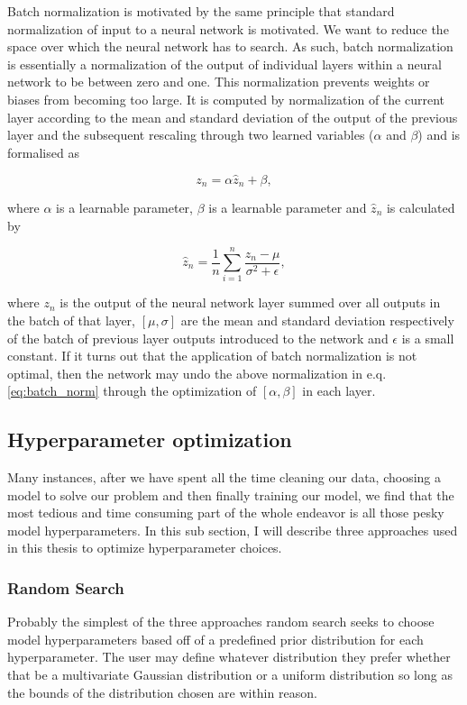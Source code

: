 %
%
Batch normalization is motivated by the same principle that standard normalization of input to a neural network is motivated. We want to reduce the space over which the neural network has to search. As such, batch normalization is essentially a normalization of the output of individual layers within a neural network to be between zero and one. This normalization prevents weights or biases from becoming too large. It is computed by normalization of the current layer according to the mean and standard deviation of the output of the previous layer and the subsequent rescaling through two learned variables ($\alpha$ and $\beta$) and is formalised as 

\begin{equation}
    z_n = \alpha \hat{z}_n + \beta,
\end{equation}{}

where $\alpha$ is a learnable parameter, $\beta$ is a learnable parameter and $\hat{z}_n$ is calculated by 

\begin{equation}\label{eq:batch_norm}
    \hat{z}_n = \frac{1}{n} \sum_{i=1}^{n} \frac{z_n - \mu}{\sigma^{2} + \epsilon},
\end{equation}{}

where $z_n$ is the output of the neural network layer summed over all outputs in the batch of that layer, $[\mu,\sigma]$ are the mean and standard deviation respectively of the batch of previous layer outputs introduced to the network and $\epsilon$ is a small constant. If it turns out that the application of batch normalization is not optimal, then the network may undo the above normalization in e.q. \ref{eq:batch_norm} through the optimization of $[\alpha,\beta]$ in each layer.

\subsection{Hyperparameter optimization}

Many instances, after we have spent all the time cleaning our data, 
choosing a model to solve our problem and then finally 
training our model, we find that the most tedious and 
time consuming part of the whole endeavor is all those 
pesky model hyperparameters. In this sub section, I will 
describe three approaches used in this thesis to optimize 
hyperparameter choices.

\subsubsection{Random Search}
Probably the simplest of the three approaches random search 
seeks to choose model hyperparameters based off of a 
predefined prior distribution for each hyperparameter. 
The user may define whatever distribution they prefer 
whether that be a multivariate Gaussian distribution 
or a uniform distribution so long as the bounds of the 
distribution chosen are within reason.

